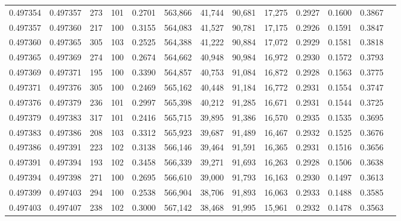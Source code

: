 \begin{tabular}{rrrrrrrrrrrrr}
0.497354 & 0.497357 &   273 & 101 &                                     0.2701 & 563,866 &  41,744 &  90,681 &  17,275 & 0.2927 & 0.1600 & 0.3867 \\
0.497357 & 0.497360 &   217 & 100 &                                     0.3155 & 564,083 &  41,527 &  90,781 &  17,175 & 0.2926 & 0.1591 & 0.3847 \\
0.497360 & 0.497365 &   305 & 103 &                                     0.2525 & 564,388 &  41,222 &  90,884 &  17,072 & 0.2929 & 0.1581 & 0.3818 \\
0.497365 & 0.497369 &   274 & 100 &                                     0.2674 & 564,662 &  40,948 &  90,984 &  16,972 & 0.2930 & 0.1572 & 0.3793 \\
0.497369 & 0.497371 &   195 & 100 &                                     0.3390 & 564,857 &  40,753 &  91,084 &  16,872 & 0.2928 & 0.1563 & 0.3775 \\
0.497371 & 0.497376 &   305 & 100 &                                     0.2469 & 565,162 &  40,448 &  91,184 &  16,772 & 0.2931 & 0.1554 & 0.3747 \\
0.497376 & 0.497379 &   236 & 101 &                                     0.2997 & 565,398 &  40,212 &  91,285 &  16,671 & 0.2931 & 0.1544 & 0.3725 \\
0.497379 & 0.497383 &   317 & 101 &                                     0.2416 & 565,715 &  39,895 &  91,386 &  16,570 & 0.2935 & 0.1535 & 0.3695 \\
0.497383 & 0.497386 &   208 & 103 &                                     0.3312 & 565,923 &  39,687 &  91,489 &  16,467 & 0.2932 & 0.1525 & 0.3676 \\
0.497386 & 0.497391 &   223 & 102 &                                     0.3138 & 566,146 &  39,464 &  91,591 &  16,365 & 0.2931 & 0.1516 & 0.3656 \\
0.497391 & 0.497394 &   193 & 102 &                                     0.3458 & 566,339 &  39,271 &  91,693 &  16,263 & 0.2928 & 0.1506 & 0.3638 \\
0.497394 & 0.497398 &   271 & 100 &                                     0.2695 & 566,610 &  39,000 &  91,793 &  16,163 & 0.2930 & 0.1497 & 0.3613 \\
0.497399 & 0.497403 &   294 & 100 &                                     0.2538 & 566,904 &  38,706 &  91,893 &  16,063 & 0.2933 & 0.1488 & 0.3585 \\
0.497403 & 0.497407 &   238 & 102 &                                     0.3000 & 567,142 &  38,468 &  91,995 &  15,961 & 0.2932 & 0.1478 & 0.3563 \\

\end{tabular}
